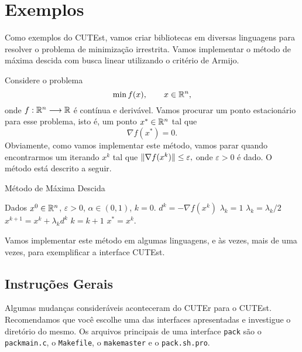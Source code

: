 \section{Exemplos}
Como exemplos do CUTEst, vamos criar bibliotecas em diversas linguagens para
resolver o problema de minimização irrestrita. Vamos implementar o método de
máxima descida com busca linear utilizando o critério de Armijo.

Considere o problema
\begin{equation*}
 \min f(x), \qquad x \in \mathbb{R}^{n},
\end{equation*}
onde $f:\mathbb{R}^{n}\longrightarrow\mathbb{R}$ é contínua e derivável. Vamos procurar um ponto estacionário para esse
problema, isto é, um ponto $x^* \in \mathbb{R}^{n}$ tal que $$\nabla f(x^*) = 0.$$
Obviamente, como vamos implementar este método, vamos parar quando encontrarmos um
iterando $x^k$ tal que $\Vert \nabla f(x^k)\Vert \leq \varepsilon,$ onde $\varepsilon > 0$ é
dado. O método está descrito a seguir.
\begin{algorithm}[H]
\caption{Método de Máxima Descida}
 \begin{algorithmic}[1]
 \State Dados $x^0 \in \mathbb{R}^{n}$, $\varepsilon > 0$, $\alpha \in (0,1)$, $k = 0$.
  \State $d^k = -\nabla f(x^k)$
  \State $\lambda_k = 1$
   \State $\lambda_k = \lambda_k/2$
  \EndWhile
  \State $x^{k+1} = x^k + \lambda_kd^k$
  \State $k = k + 1$
 \EndWhile
 \State $x^* = x^k$.
 \end{algorithmic}
\end{algorithm}
Vamos implementar este método em algumas linguagens, e às vezes, mais de uma vezes, para
exemplificar a interface CUTEst.

\subsection{Instruções Gerais}

Algumas mudanças consideráveis aconteceram do CUTEr para o CUTEst. Recomendamos
que você escolhe uma das interfaces apresentadas e investigue o diretório do
mesmo.
Os arquivos principais de uma interface \verb+pack+ são o \verb+packmain.c+, o
\verb+Makefile+, o \verb+makemaster+ e o \verb+pack.sh.pro+.




